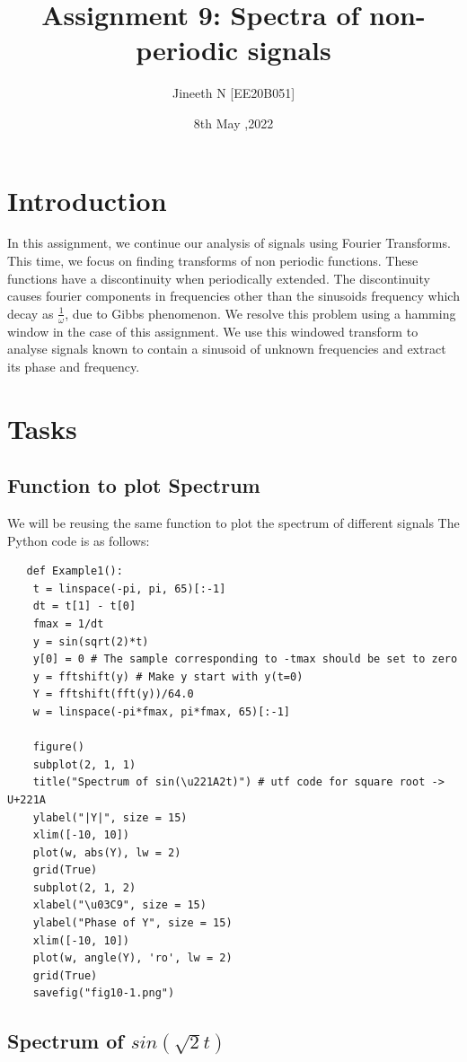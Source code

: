 \documentclass{article}
\title{Assignment 9: Spectra of non-periodic signals}
\author{Jineeth N [EE20B051]}
\date{8th May ,2022}
\begin{document}
\maketitle

\section{Introduction}
In this assignment, we continue our analysis of signals using Fourier Transforms. This time, we focus on finding transforms of non periodic functions. These functions have a discontinuity when periodically extended.\newline 
The discontinuity causes fourier components in frequencies other than the sinusoids frequency which decay as
\(\frac{1}{\omega}\), due to Gibbs phenomenon. We resolve this problem using a hamming window in the case of this assignment.\newline 
We use this windowed transform to analyse signals known to contain a sinusoid of unknown frequencies and extract its phase and frequency.

\section{Tasks}
\subsection{Function to plot Spectrum}
We will be reusing the same function to plot the spectrum of different signals
\newline
The Python code is as follows:
\begin{verbatim}
   def Example1():
    t = linspace(-pi, pi, 65)[:-1]
    dt = t[1] - t[0] 
    fmax = 1/dt
    y = sin(sqrt(2)*t)
    y[0] = 0 # The sample corresponding to -tmax should be set to zero
    y = fftshift(y) # Make y start with y(t=0)
    Y = fftshift(fft(y))/64.0
    w = linspace(-pi*fmax, pi*fmax, 65)[:-1]
    
    figure()
    subplot(2, 1, 1)
    title("Spectrum of sin(\u221A2t)") # utf code for square root -> U+221A
    ylabel("|Y|", size = 15)
    xlim([-10, 10])
    plot(w, abs(Y), lw = 2)
    grid(True)
    subplot(2, 1, 2)
    xlabel("\u03C9", size = 15)
    ylabel("Phase of Y", size = 15)
    xlim([-10, 10])
    plot(w, angle(Y), 'ro', lw = 2)
    grid(True)
    savefig("fig10-1.png") 
\end{verbatim}

\subsection{Spectrum of $sin(\sqrt{2}t)$}
\end{document}
